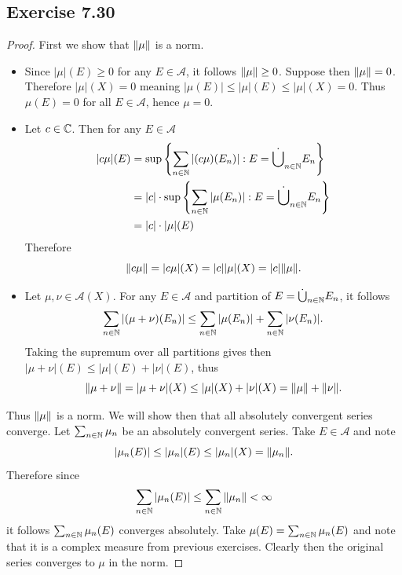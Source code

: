 \documentclass[hw_all.tex]{subfiles}
\begin{document}
\subsection{Exercise 7.30}
\begin{proof}
    First we show that $\norm{\mu}$ is a norm.
    \begin{itemize}
        \item 
            Since $|\mu|(E) \geq 0$ for any $E \in \mathcal{A}$, it follows $\norm{\mu} \geq 0$. Suppose then $\norm{\mu} = 0$. Therefore $|\mu|(X) = 0$ meaning $|\mu(E)| \leq |\mu|(E) \leq |\mu|(X) = 0$. Thus $\mu(E) = 0$ for all $E \in \mathcal{A}$, hence $\mu = 0$.

        \item 
            Let $c \in \mathbb{C}$. Then for any $E \in \mathcal{A}$
            \begin{align*}
                |c \mu|(E) &= \sup\qty{ \sum_{n \in \mathbb{N}} |(c \mu)(E_n)| : E = \dot{\bigcup}_{n \in \mathbb{N}} E_n } \\
                           &= |c| \cdot \sup\qty{ \sum_{n \in \mathbb{N}} |\mu(E_n)| : E = \dot{\bigcup}_{n \in \mathbb{N}} E_n } \\
                           &= |c| \cdot |\mu|(E)
            \end{align*}
            Therefore
            \[
                \norm{c \mu} = |c \mu|(X) = |c| |\mu|(X) = |c| \norm{\mu}
            .\]

        \item 
            Let $\mu, \nu \in \mathcal{A}(X)$. For any $E \in \mathcal{A}$ and partition of $E = \dot{\bigcup}_{n \in \mathbb{N}} E_n$, it follows
            \[
                \sum_{n \in \mathbb{N}} |(\mu + \nu)(E_n)| \leq \sum_{n \in \mathbb{N}} |\mu(E_n)| + \sum_{n \in \mathbb{N}} |\nu(E_n)|
            .\]
            Taking the supremum over all partitions gives then $|\mu + \nu|(E) \leq |\mu|(E) + |\nu|(E)$, thus
            \[
                \norm{\mu + \nu} = |\mu + \nu|(X) \leq |\mu|(X) + |\nu|(X) = \norm{\mu} + \norm{\nu}
            .\]
    \end{itemize}
    Thus $\norm{\mu}$ is a norm. We will show then that all absolutely convergent series converge. Let $\sum_{n \in \mathbb{N}} \mu_n$ be an absolutely convergent series. Take $E \in \mathcal{A}$ and note
    \[
        |\mu_n(E)| \leq |\mu_n|(E) \leq |\mu_n|(X) = \norm{\mu_n}
    .\]
    Therefore since
    \[
        \sum_{n \in \mathbb{N}} |\mu_n(E)| \leq \sum_{n \in \mathbb{N}} \norm{\mu_n} < \infty
    \]
    it follows $\sum_{n \in \mathbb{N}} \mu_n(E)$ converges absolutely. Take $\mu(E) = \sum_{n \in \mathbb{N}} \mu_n(E)$ and note that it is a complex measure from previous exercises. Clearly then the original series converges to $\mu$ in the norm.
\end{proof}
\end{document}
